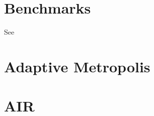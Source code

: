 \section{Benchmarks}
See \cite{magnusson2024posteriordbtestingbenchmarkingdeveloping}

\section{Adaptive Metropolis}

\section{AIR}